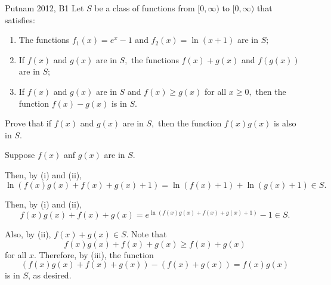 \begin{prob}{Putnam 2012, B1}{}
	Let $S$ be a class of functions from $[0,\infty)$ to $[0,\infty)$ that satisfies:
	\begin{enumerate}[label = (\roman*), left = 0pt]
		\item The functions $f_1(x)=e^x-1$ and $f_2(x)=\ln(x+1)$ are in $S;$
		\item If $f(x)$ and $g(x)$ are in $S,$ the functions $f(x)+g(x)$ and $f(g(x))$ are in $S;$
		\item If $f(x)$ and $g(x)$ are in $S$ and $f(x)\ge g(x)$ for all $x\ge 0,$ then the function $f(x)-g(x)$ is in $S.$
	\end{enumerate}
	Prove that if $f(x)$ and $g(x)$ are in $S,$ then the function $f(x)g(x)$ is also in $S.$
\end{prob}
\begin{sol}{}{}
	Suppose \(f(x)\) anf \(g(x)\) are in \(S\).

	Then, by (i) and (ii), \[
		\ln(f(x)g(x) + f(x) + g(x) + 1) = 
		\ln(f(x) + 1) + \ln(g(x) + 1) \in S.
	\]

	Then, by (i) and (ii), \[
		f(x)g(x) + f(x) + g(x) = e^{\ln(f(x)g(x) + f(x) + g(x) + 1)} - 1 \in S.
	\]

	Also, by (ii), \(f(x) + g(x) \in S\). Note that \[
		f(x)g(x) + f(x) + g(x) \geq f(x) + g(x)
	\] for all \(x\). Therefore, by (iii), the function \[
	\left(f(x)g(x) + f(x) + g(x)\right) - \left(f(x) + g(x)\right) = f(x)g(x)
	\] is in \(S\), as desired.
\end{sol}

